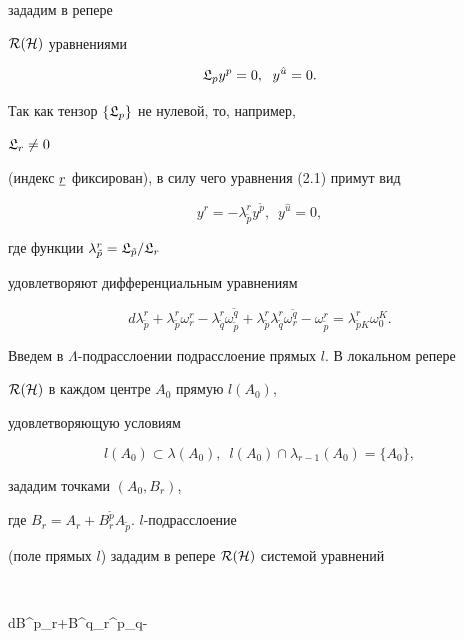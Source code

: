 зададим в репере


$\cal R(\cal H)$ \cite{rab1} уравнениями


\begin{equation}


\frak L_p y^p = 0,\ \; y^{\hat u} = 0.


\end{equation}


Так как тензор $\{\frak L_p\}$ не нулевой, то, например,


$\frak L_r\ne0$


(индекс $\underline r$ фиксирован), в силу чего уравнения (2.1) примут вид


$$


y^{r}=-\lambda^{r}_{\tilde p} y^{\tilde p},\ \;


y^{\hat u}=0,


$$


где функции $\lambda^{r}_{\tilde p}


=\frak L_{\tilde p} / \frak L_{r}$


удовлетворяют дифференциальным уравнениям


$$


d\lambda^r_{\tilde p}+\lambda^r_{\tilde p}\omega^r_r-


\lambda^r_{\tilde q}\omega^{\tilde q}_{\tilde p}+


\lambda^r_{\tilde p}\lambda^r_{\tilde q}\omega^{\tilde q}_r-


\omega^r_{\tilde p}=\lambda^r_{\tilde p K}\omega^K_0.


$$


Введем в $\Lambda$-подрасслоении подрасслоение прямых $l$. В локальном репере


$\cal R(\cal H)$ в каждом центре $A_0$ прямую $l(A_0)$,


удовлетворяющую условиям


$$


l (A_0)\subset \lambda (A_0),\ \;


l(A_0) \cap \lambda_{r-1}(A_0)= \{ A_0\},


$$


зададим точками $(A_0, B_r)$,


где $B_r = A_r + B^{\tilde p}_r A_{\tilde p}$.\; $l$-подрасслоение


(поле прямых $l$) зададим в репере $\cal R(\cal H)$ системой уравнений


$$


dB^{\tilde p}_r+B^{\tilde q}_r\omega^{\tilde p}_{\tilde q}-


